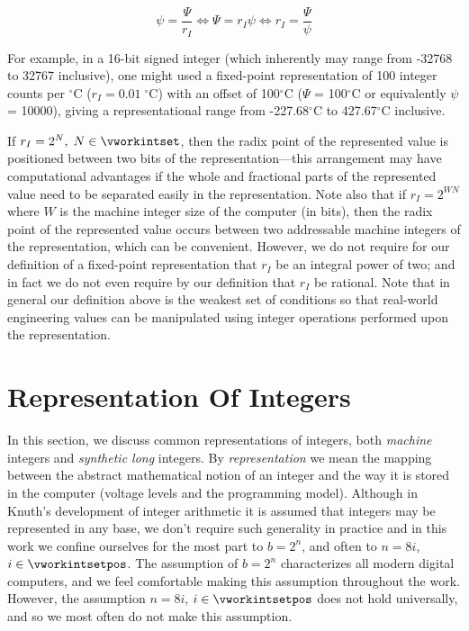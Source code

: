 \begin{equation}
\label{eq:ccil0:sfpa0:03}
\psi = \frac{\Psi}{r_I}
\Longleftrightarrow
\Psi = r_I \psi
\Longleftrightarrow
r_I = \frac{\Psi}{\psi}
\end{equation}


For example, in a 16-bit signed integer (which inherently may range
from -32768 to 32767 inclusive), one might used a fixed-point
representation of 100 integer counts per $^\circ$C ($r_I = 0.01 \; ^\circ$C)
with an offset of 100$^\circ$C ($\Psi$ = 100$^\circ$C or equivalently
$\psi$ = 10000), giving
a representational range from -227.68$^\circ$C to 427.67$^\circ$C inclusive.

If $r_I = 2^N, \; N \in \vworkintset$, then the radix point of the represented 
value is positioned 
between two bits of the representation---this arrangement may have computational
advantages
if the whole and fractional parts of the represented value need to be separated
easily in the representation.  Note also that if $r_I = 2^{WN}$ where $W$ is the 
machine integer size of the computer (in bits), then the radix point of the represented value
occurs between two addressable machine integers of the representation, which can be convenient.
However, we do not require for our definition of a fixed-point representation that 
$r_I$ be an integral power of two; and in fact we do not even require by our
definition that $r_I$ be rational.  Note that in general our definition above is the
weakest set of conditions so that real-world engineering values can be manipulated
using integer operations performed upon the representation.


\section{Representation Of Integers}
\label{ccil0:sroi0}

In this section, we discuss common representations of integers, both
\emph{machine} integers and \emph{synthetic long} integers.  
By \emph{representation} we mean the mapping between the abstract
mathematical notion of an integer and the way it is stored in the computer
(voltage levels and the programming model). 
Although
in Knuth's development of integer arithmetic
\cite{bibref:b:knuthclassic2ndedvol2}
 it is assumed that 
integers may be represented in any base, we don't require such generality
in practice and in this work we confine ourselves for the most
part to $b=2^n$, and often to $n = 8i$, $i \in \vworkintsetpos$.  The assumption
of $b=2^n$ characterizes all modern digital computers, and we feel comfortable
making this assumption throughout the work.  However, the assumption 
$n = 8i$, $i \in \vworkintsetpos$ does not hold universally, and so we
most often do not make this assumption.

